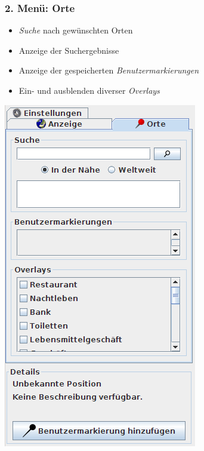 \documentclass[10pt]{scrreprt}
\newcommand{\textref}[1]{\mbox{\raisebox{0.1ex}{\small$\rightarrow$ }\textit{#1}}}
\begin{document}
\vspace{10mm}
\begin{minipage}[t]{9cm}
\vspace{-40mm}
\subsubsection{2. Menü: Orte}  
	\begin{itemize}
	\item \textref{Suche} nach gewünschten Orten 
	\item Anzeige der Suchergebnisse
	\item Anzeige der gespeicherten \textref{Benutzermarkierungen} 
	\item Ein- und ausblenden diverser \textref{Overlays} 
	\end{itemize}
\end{minipage}
\begin{minipage}{7cm}
\centering
\includegraphics[scale=0.4]{images/orte_tab.png}
\end{minipage}
\end{document}
